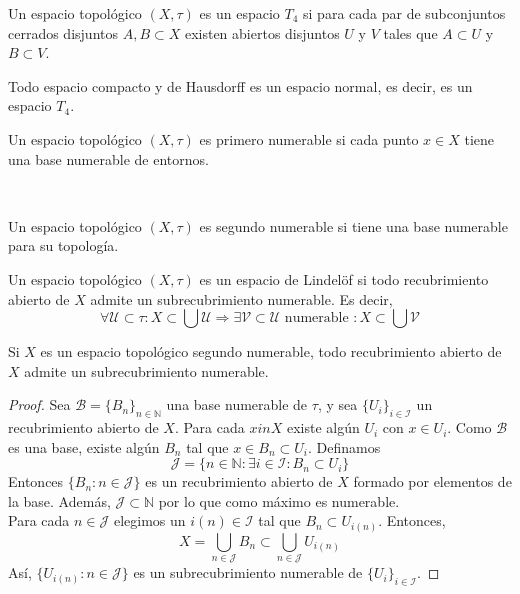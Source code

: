 \begin{definición}
    Un espacio topológico $(X, \tau)$ es un espacio $T_4$ si para cada par de subconjuntos cerrados disjuntos $A, B \subset X$ existen abiertos disjuntos $U$ y $V$ tales que $A \subset U$ y $B \subset V$.
\end{definición}
\begin{corolario}
    Todo espacio compacto y de Hausdorff es un espacio normal, es decir, es un espacio $T_4$.
\end{corolario}
\begin{definición}
    Un espacio topológico $(X, \tau)$ es primero numerable si cada punto $x \in X$ tiene una base numerable de entornos.
\end{definición}\
\begin{definición}
    Un espacio topológico $(X, \tau)$ es segundo numerable si tiene una base numerable para su topología.
\end{definición}
\begin{definición}
    Un espacio topológico $(X, \tau)$ es un espacio de Lindelöf si todo recubrimiento abierto de $X$ admite un subrecubrimiento numerable. Es decir, 
    $$\forall \mathcal{U} \subset \tau : X \subset \bigcup \mathcal{U} \Rightarrow \exists \mathcal{V} \subset \mathcal{U} \text{ numerable } : X \subset \bigcup \mathcal{V}$$
    
\end{definición}
\begin{teorema}
    Si $X$ es un espacio topológico segundo numerable, todo recubrimiento abierto de $X$ admite un subrecubrimiento numerable.
\end{teorema}
\begin{proof}
    Sea $\mathcal{B} = \{B_n\}_{n \in \mathbb{N}}$ una base numerable de $\tau$, y sea $\{U_i\}_{i \in \mathcal{I}}$ un recubrimiento abierto de $X$. Para cada $x in X$ existe algún $U_i$ con $x \in U_i$. Como $\mathcal{B}$ es una base, existe algún $B_n$ tal que $x \in B_n \subset U_i$. Definamos 
    $$\mathcal{J} = \{n \in \mathbb{N} : \exists i \in \mathcal{I} : B_n \subset U_i\}$$
    Entonces $\{B_n : n \in \mathcal{J}\}$ es un recubrimiento abierto de $X$ formado por elementos de la base. Además, $\mathcal{J} \subset \mathbb{N}$ por lo que como máximo es numerable. \\
    Para cada $n \in \mathcal{J}$ elegimos un $i(n) \in \mathcal{I}$ tal que $B_n \subset U_{i(n)}$. Entonces, 
    $$X = \bigcup_{n \in \mathcal{J}} B_n \subset \bigcup_{n \in \mathcal{J}} U_{i(n)}$$
    Así, $\{U_{i(n)} : n \in \mathcal{J}\}$ es un subrecubrimiento numerable de $\{U_i\}_{i \in \mathcal{I}}$.
\end{proof}
